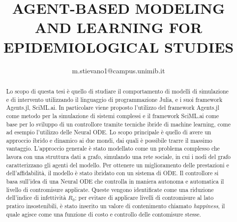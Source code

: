 \documentclass{article}
\title{AGENT-BASED MODELING AND LEARNING FOR EPIDEMIOLOGICAL STUDIES}
\author{m.stievano1@campus.unimib.it}
\begin{document}


\begin{abstract}
    Lo scopo di questa tesi è quello di studiare il comportamento di modelli di simulazione
    e di intervento utilizzando il linguaggio di programmazione Julia, e i suoi framework
    Agents.jl, SciML.ai. In particolare viene proposto l'utilizzo del framework Agents.jl come 
    metodo per la simulazione di sistemi complessi e il framework SciML.ai come base per 
    lo sviluppo di un controllore tramite tecniche ibride di machine learning, come ad esempio 
    l'utilizzo delle Neural ODE. Lo scopo principale è quello di avere un approccio ibrido e dinamico 
    ai due mondi, dai quali è possibile trarre il massimo vantaggio. L'approccio generale 
    è stato modellato come un problema complesso che lavora con una struttura dati a grafo, simulando
    una rete sociale, in cui i nodi del grafo caratterizzano gli agenti del modello. Per ottenere un 
    miglioramento delle prestazioni e dell'affidabilità, il modello è stato ibridato con 
    un sistema di ODE. Il controllore si basa sull'idea di una Neural ODE che controlla 
    in maniera autonoma e automatica il livello di contromisure applicate. Queste vengono 
    identificate come una riduzione dell'indice di infettività $R_0$; per evitare di applicare 
    livelli di contromisure al lato pratico insostenibili, è stato inserito un valore di contenimento 
    chiamato \emph{happiness}, il quale agisce come una funzione di costo e controllo delle contomisure stesse.
\end{abstract}



\tableofcontents
\newpage
\listoffigures
\newpage














% 
% 

\nocite{*}

% 
% 



\appendix

\end{document}
